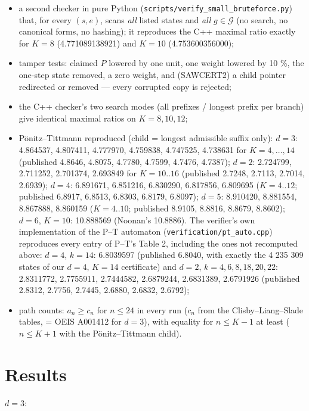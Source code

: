 \documentclass[11pt,a4paper]{report}
\begin{document}
\begin{itemize}
\tightlist
\item
  a second checker in pure Python (\texttt{scripts/verify\_small\_bruteforce.py}) that, for every \((s,e)\), scans \emph{all}
  listed states and \emph{all} \(g\in\mathcal G\) (no search, no canonical forms, no hashing); it reproduces the C++
  maximal ratio exactly for \(K=8\) (4.771089138921) and \(K=10\) (4.753600356000);
\item
  tamper tests: claimed \(P\) lowered by one unit, one weight lowered by 10 \%, the one-step state removed, a zero
  weight, and (SAWCERT2) a child pointer redirected or removed --- every corrupted copy is rejected;
\item
  the C++ checker's two search modes (all prefixes / longest prefix per branch) give identical maximal ratios on
  \(K=8,10,12\);
\item
  Pönitz--Tittmann reproduced (child = longest admissible suffix only): \(d=3\): 4.864537, 4.807411, 4.777970,
  4.759838, 4.747525, 4.738631 for \(K=4,\dots,14\) (published 4.8646, 4.8075, 4.7780, 4.7599, 4.7476, 4.7387);
  \(d=2\): 2.724799, 2.711252, 2.701374, 2.693849 for \(K=10..16\) (published 2.7248, 2.7113, 2.7014, 2.6939);
  \(d=4\): 6.891671, 6.851216, 6.830290, 6.817856, 6.809695 (\(K=4..12\); published 6.8917, 6.8513, 6.8303,
  6.8179, 6.8097); \(d=5\): 8.910420, 8.881554, 8.867888, 8.860159 (\(K=4..10\); published 8.9105, 8.8816,
  8.8679, 8.8602); \(d=6\), \(K=10\): 10.888569 (Noonan's 10.8886). The verifier's own implementation
  of the P--T automaton (\texttt{verification/pt\_auto.cpp}) reproduces every entry of P--T's Table 2, including the
  ones not recomputed above: \(d=4\), \(k=14\): 6.8039597 (published 6.8040, with exactly the 4 235 309 states of our
  \(d=4\), \(K=14\) certificate) and \(d=2\), \(k=4,6,8,18,20,22\): 2.8311772, 2.7755911, 2.7444582, 2.6879244,
  2.6831389, 2.6791926 (published 2.8312, 2.7756, 2.7445, 2.6880, 2.6832, 2.6792);
\item
  path counts: \(a_n\ge c_n\) for \(n\le24\) in every run (\(c_n\) from the Clisby--Liang--Slade tables, = OEIS A001412
  for \(d=3\)), with equality for \(n\le K-1\) at least (\(n\le K+1\) with the Pönitz--Tittmann child).
\end{itemize}

\section{Results}

\(d=3\):
\end{document}
